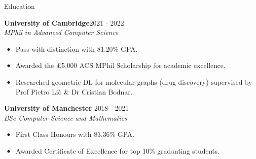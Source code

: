 \documentclass[hidelinks]{resume} %
\begin{document}
\begin{rSection}{Education}

{\textbf{University of Cambridge}\hfill {2021 - 2022}\\
\textit{MPhil in Advanced Computer Science}}
\begin{itemize}
    \item Pass with distinction with 81.20\% GPA.
    \item Awarded the £5,000 ACS MPhil Scholarship for academic excellence.
    \item Researched geometric DL for molecular graphs (drug discovery) supervised by Prof Pietro Liò \& Dr Cristian Bodnar.
\end{itemize}

{\textbf{University of Manchester}} \hfill {2018 - 2021}\\
\textit{BSc Computer Science and Mathematics}
\begin{itemize}
    \item First Class Honours with 83.36\% GPA.
    \item Awarded Certificate of Excellence for top 10\% graduating students.
\end{itemize}

\end{rSection}
% 
\end{document}
